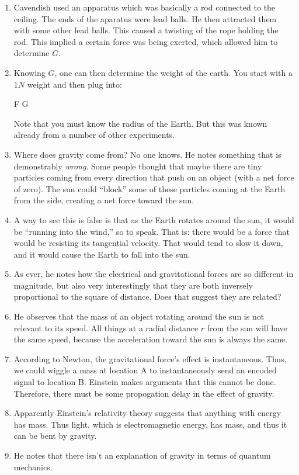 \begin{enumerate}
  \item Cavendish used an apparatus which was basically a rod connected
  to the ceiling. The ends of the aparatus were lead balls. He then
  attracted them with some other lead balls. This caused a twisting of
  the rope holding the rod. This implied a certain force was being
  exerted, which allowed him to determine $G$.

  \item Knowing $G$, one can then determine the weight of the earth. You
  start with a $1N$ weight and then plug into:

  \begin{nedqn}
    F
  \eqcol
    G 
  \end{nedqn}

  Note that you must know the radius of the Earth. But this was known
  already from a number of other experiments.

  \item Where does gravity come from? No one knows. He notes something
  that is demonstrably \emph{wrong}. Some people thought that maybe
  there are tiny particles coming from every direction that push on an
  object (with a net force of zero). The sun could ``block'' some of
  these particles coming at the Earth from the side, creating a net
  force toward the sun.

  \item A way to see this is false is that as the Earth rotates around
  the sun, it would be ``running into the wind,'' so to speak. That is:
  there would be a force that would be resisting its tangential
  velocity. That would tend to slow it down, and it would cause the
  Earth to fall into the sun.

  \item As ever, he notes how the electrical and gravitational forces
  are so different in magnitude, but also very interestingly that they
  are both inversely proportional to the square of distance. Does that
  suggest they are related?

  \item He observes that the mass of an object rotating around the sun
  is not relevant to its speed. All things at a radial distance $r$ from
  the sun will have the same speed, because the acceleration toward the
  sun is always the same.

  \item According to Newton, the gravitational force's effect is
  instantaneous. Thus, we could wiggle a mass at location A to
  instantaneously send an encoded signal to location B. Einstein makes
  arguments that this cannot be done. Therefore, there must be some
  propogation delay in the effect of gravity.

  \item Apparently Einstein's relativity theory suggests that anything
  with energy has mass. Thus light, which is electromagnetic energy, has
  mass, and thus it can be bent by gravity.

  \item He notes that there isn't an explanation of gravity in terms of
  quantum mechanics.

\end{enumerate}


